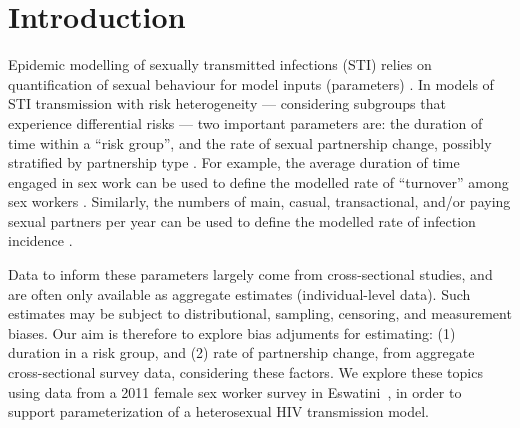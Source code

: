 \section{Introduction}
Epidemic modelling of sexually transmitted infections (STI) relies on
quantification of sexual behaviour for model inputs (parameters) \cite{Garnett2002}.
In models of STI transmission with risk heterogeneity
--- \ie considering subgroups that experience differential risks ---
two important parameters are:
the duration of time within a ``risk group'', and
the rate of sexual partnership change, possibly stratified by partnership type
\cite{Garnett1996,Stigum1997,Watts2010,Knight2020}.
For example, the average duration of time engaged in sex work
can be used to define the modelled rate of ``turnover'' among sex workers \cite{Watts2010}.
Similarly, the numbers of main, casual, transactional, and/or paying sexual partners per year
can be used to define the modelled rate of infection incidence \cite{Boily2015}.
\par
Data to inform these parameters largely come from cross-sectional studies,
and are often only available as aggregate estimates (\vs individual-level data).
Such estimates may be subject to distributional, sampling, censoring, and measurement biases.
Our aim is therefore to explore bias adjuments for estimating:
(1) duration in a risk group, and (2) rate of partnership change,
from aggregate cross-sectional survey data, considering these factors.
We explore these topics using data from
a 2011 female sex worker survey in Eswatini~\cite{Baral2014},
in order to support parameterization of a heterosexual HIV transmission model.
